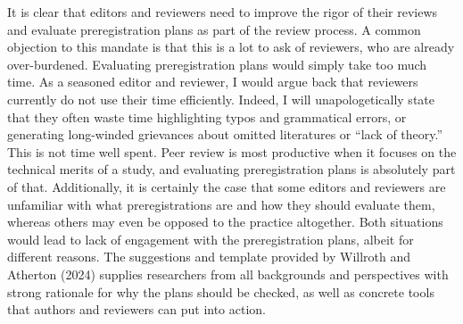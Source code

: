 \documentclass[authordate, empirical]{jote-new-article}
\begin{document}
	It is clear that editors and reviewers need to improve the rigor of their reviews and evaluate preregistration plans as part of the review process. A common objection to this mandate is that this is a lot to ask of reviewers, who are already over-burdened. Evaluating preregistration plans would simply take too much time. As a seasoned editor and reviewer, I would argue back that reviewers currently do not use their time efficiently. Indeed, I will unapologetically state that they often waste time highlighting typos and grammatical errors, or generating long-winded grievances about omitted literatures or “lack of theory.” This is not time well spent. Peer review is most productive when it focuses on the technical merits of a study, and evaluating preregistration plans is absolutely part of that. Additionally, it is certainly the case that some editors and reviewers are unfamiliar with what preregistrations are and how they should evaluate them, whereas others may even be opposed to the practice altogether. Both situations would lead to lack of engagement with the preregistration plans, albeit for different reasons. The suggestions and template provided by Willroth and Atherton (2024) supplies researchers from all backgrounds and perspectives with strong rationale for why the plans should be checked, as well as concrete tools that authors and reviewers can put into action.
\end{document}
